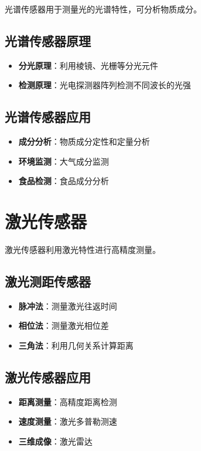 \documentclass[12pt,UTF8]{ctexbook}
\begin{document}
光谱传感器用于测量光的光谱特性，可分析物质成分。

\subsection{光谱传感器原理}

\begin{itemize}[leftmargin=2cm]
	\item \textbf{分光原理}：利用棱镜、光栅等分光元件
	\item \textbf{检测原理}：光电探测器阵列检测不同波长的光强
\end{itemize}

\subsection{光谱传感器应用}

\begin{itemize}[leftmargin=2cm]
	\item \textbf{成分分析}：物质成分定性和定量分析
	\item \textbf{环境监测}：大气成分监测
	\item \textbf{食品检测}：食品成分分析
\end{itemize}

\section{激光传感器}

激光传感器利用激光特性进行高精度测量。

\subsection{激光测距传感器}

\begin{itemize}[leftmargin=2cm]
	\item \textbf{脉冲法}：测量激光往返时间
	\item \textbf{相位法}：测量激光相位差
	\item \textbf{三角法}：利用几何关系计算距离
\end{itemize}

\subsection{激光传感器应用}

\begin{itemize}[leftmargin=2cm]
	\item \textbf{距离测量}：高精度距离检测
	\item \textbf{速度测量}：激光多普勒测速
	\item \textbf{三维成像}：激光雷达
\end{itemize}
\end{document}
